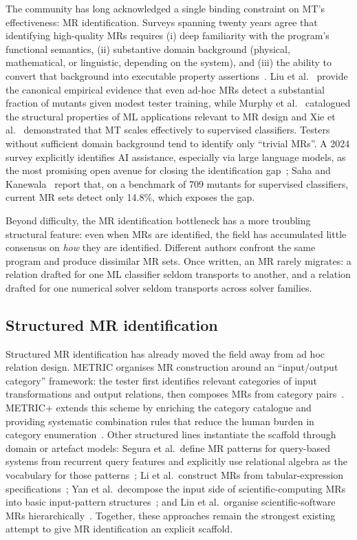 \documentclass[acmsmall,screen,review]{acmart}
\begin{document}
The community has long acknowledged a single binding constraint on MT's effectiveness: MR identification. Surveys spanning twenty years agree that identifying high-quality MRs requires (i) deep familiarity with the program's functional semantics, (ii) substantive domain background (physical, mathematical, or linguistic, depending on the system), and (iii) the ability to convert that background into executable property assertions~\cite{Segura2016, LiTOSEM2025}. Liu et al.~\cite{Liu2014MTEffectiveness} provide the canonical empirical evidence that even ad-hoc MRs detect a substantial fraction of mutants given modest tester training, while Murphy et al.~\cite{Murphy2008} catalogued the structural properties of ML applications relevant to MR design and Xie et al.~\cite{Xie2011} demonstrated that MT scales effectively to supervised classifiers. Testers without sufficient domain background tend to identify only ``trivial MRs''. A 2024 survey explicitly identifies AI assistance, especially via large language models, as the most promising open avenue for closing the identification gap~\cite{LiTOSEM2025}; Saha and Kanewala~\cite{Saha2019SupervisedMR} report that, on a benchmark of 709 mutants for supervised classifiers, current MR sets detect only 14.8\%, which exposes the gap.

Beyond difficulty, the MR identification bottleneck has a more troubling structural feature: even when MRs are identified, the field has accumulated little consensus on \emph{how} they are identified. Different authors confront the same program and produce dissimilar MR sets. Once written, an MR rarely migrates: a relation drafted for one ML classifier seldom transports to another, and a relation drafted for one numerical solver seldom transports across solver families.

\subsection{Structured MR identification}

Structured MR identification has already moved the field away from ad hoc relation design. METRIC organises MR construction around an ``input/output category'' framework: the tester first identifies relevant categories of input transformations and output relations, then composes MRs from category pairs~\cite{ChenMETRIC2016}. METRIC+ extends this scheme by enriching the category catalogue and providing systematic combination rules that reduce the human burden in category enumeration~\cite{SunMETRICplus2021}. Other structured lines instantiate the scaffold through domain or artefact models: Segura et al.\ define MR patterns for query-based systems from recurrent query features and explicitly use relational algebra as the vocabulary for those patterns~\cite{Segura2019QBSMRPatterns}; Li et al.\ construct MRs from tabular-expression specifications~\cite{Li2020TabularMR}; Yan et al.\ decompose the input side of scientific-computing MRs into basic input-pattern structures~\cite{Yan2022InputPattern}; and Lin et al.\ organise scientific-software MRs hierarchically~\cite{Lin2018HierarchicalMR}. Together, these approaches remain the strongest existing attempt to give MR identification an explicit scaffold.
\end{document}
